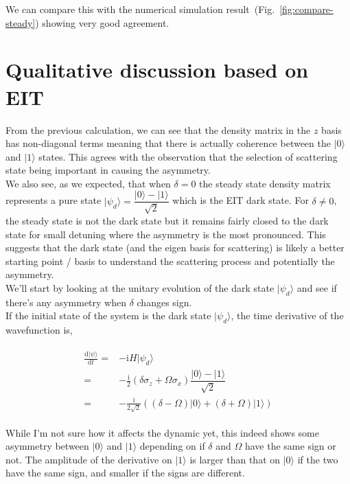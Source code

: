 \documentclass[10pt,fleqn]{article}
\newcommand{\ud}{\mathrm{d}}
\newcommand{\ui}{\mathrm{i}}
\newcommand{\eqar}[1]
{
  \begin{align}
    #1
  \end{align}
}
\newcommand{\paren}[1]{{\left({#1}\right)}}
\newcommand{\diff}[3][{}]{{\frac{\ud^{#1} {#2}}{\ud {#3}{}^{#1}}}}
\begin{document}
We can compare this with the numerical simulation
result~(Fig.~\ref{fig:compare-steady}) showing very good agreement.\\

\section{Qualitative discussion based on EIT}
From the previous calculation, we can see that the density matrix in the $z$ basis
has non-diagonal terms meaning that there is actually coherence
between the $|0\rangle$ and $|1\rangle$ states.
This agrees with the observation that the selection of scattering state
being important in causing the asymmetry.\\

We also see, as we expected, that when $\delta=0$ the steady state density matrix
represents a pure state $|\psi_d\rangle=\dfrac{|0\rangle-|1\rangle}{\sqrt2}$
which is the EIT dark state. For $\delta\neq0$,
the steady state is not the dark state but it remains fairly closed to the dark state
for small detuning where the asymmetry is the most pronounced.
This suggests that the dark state (and the eigen basis for scattering)
is likely a better starting point / basis to understand the scattering process
and potentially the asymmetry.\\


We'll start by looking at the unitary evolution of the dark state $|\psi_d\rangle$
and see if there's any asymmetry when $\delta$ changes sign.\\

If the initial state of the system is the dark state $|\psi_d\rangle$,
the time derivative of the wavefunction is,
\eqar{
  \begin{split}
    \diff{|\psi\rangle}{t}=&-\ui H|\psi_d\rangle\\
    =&-\frac{\ui}2\paren{\delta\sigma_z+\Omega\sigma_x}\dfrac{|0\rangle-|1\rangle}{\sqrt2}\\
    =&-\frac{\ui}{2\sqrt2}\paren{\paren{\delta-\Omega}|0\rangle+\paren{\delta+\Omega}|1\rangle}
  \end{split}
}
While I'm not sure how it affects the dynamic yet, this indeed shows some asymmetry
between $|0\rangle$ and $|1\rangle$ depending on if $\delta$ and $\Omega$
have the same sign or not. The amplitude of the derivative on $|1\rangle$ is larger
than that on $|0\rangle$ if the two have the same sign,
and smaller if the signs are different.\\
\end{document}
